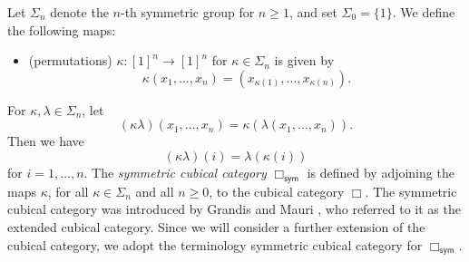 \documentclass[oneside, 12pt]{amsart}
\numberwithin{equation}{section}
\theoremstyle{plain}
\theoremstyle{definition}
\theoremstyle{remark}
\begin{document}
	Let $\Sigma_n$ denote the $n$-th symmetric group for $n\ge 1$, and set $\Sigma_0=\{1\}$. %
	We define the following maps:
	\begin{itemize}
		\item (permutations) $\kappa\colon[1]^n\to[1]^n$ for $\kappa\in\Sigma_n$ is given by
		\[
		\kappa(x_1,\ldots,x_n)=(x_{\kappa(1)},\ldots,x_{\kappa(n)}).
		\]
	\end{itemize}
	For $\kappa,\lambda\in\Sigma_n$, let
	\[
	(\kappa\lambda)(x_1,\ldots,x_n)=\kappa(\lambda(x_1,\ldots,x_n)).
	\]
	Then we have
	\[
	(\kappa\lambda)(i)=\lambda(\kappa(i))
	\]
	for $i=1,\ldots,n$. The \emph{symmetric cubical category} $\Box_\mathsf{sym}$ is defined by adjoining the maps $\kappa$, for all $\kappa\in\Sigma_n$ and all $n\ge 0$, to the cubical category $\Box$. The symmetric cubical category was introduced by Grandis and Mauri \cite{GM1}, who referred to it as the extended cubical category. Since we will consider a further extension of the cubical category, we adopt the terminology symmetric cubical category for $\Box_\mathsf{sym}$.
	
	
	
\end{document}

